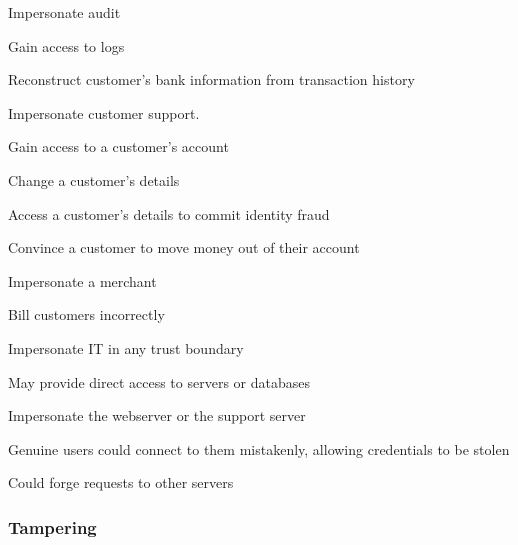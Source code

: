 \begin{numbered}
    \item \label{impersonateAudit} Impersonate audit
    \begin{numbered}
        \item Gain access to logs
        \item Reconstruct customer's bank information from transaction history
    \end{numbered}
    
    \item \label{impersonateCustomerSupport} Impersonate customer support.
    \begin{numbered}
        \item Gain access to a customer's account
        \item Change a customer's details
        \item Access a customer's details to commit identity fraud
        \item Convince a customer to move money out of their account
    \end{numbered}

    \item \label{impersonateMerchant} Impersonate a merchant
    \begin{numbered}
        \item Bill customers incorrectly
    \end{numbered}

    \item \label{impersonateIt} Impersonate IT in any trust boundary
    \begin{numbered}
        \item May provide direct access to servers or databases
    \end{numbered}

    \item \label{impersonateWebserver} Impersonate the webserver or the support server
    \begin{numbered}
        \item Genuine users could connect to them mistakenly, allowing credentials to be stolen
        \item Could forge requests to other servers
    \end{numbered}
\end{numbered}

\subsubsection{Tampering}

